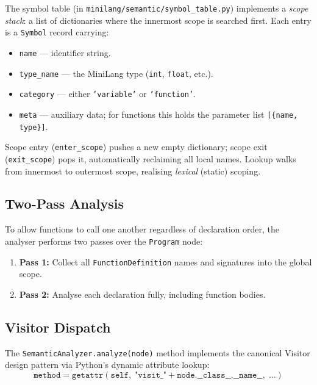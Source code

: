 \documentclass[conference]{IEEEtran}
\begin{document}
The symbol table (in \texttt{minilang/semantic/symbol\_table.py})
implements a \textit{scope stack}: a list of dictionaries where the
innermost scope is searched first. Each entry is a \texttt{Symbol}
record carrying:

\begin{itemize}
  \item \texttt{name} --- identifier string.
  \item \texttt{type\_name} --- the MiniLang type (\texttt{int}, \texttt{float}, etc.).
  \item \texttt{category} --- either \texttt{'variable'} or \texttt{'function'}.
  \item \texttt{meta} --- auxiliary data; for functions this holds the
        parameter list \texttt{[\{name, type\}]}.
\end{itemize}

Scope entry (\texttt{enter\_scope}) pushes a new empty dictionary;
scope exit (\texttt{exit\_scope}) pops it, automatically reclaiming all
local names. Lookup walks from innermost to outermost scope, realising
\textit{lexical} (static) scoping.

\subsection{Two-Pass Analysis}

To allow functions to call one another regardless of declaration order,
the analyser performs two passes over the \texttt{Program} node:

\begin{enumerate}
  \item \textbf{Pass 1:} Collect all \texttt{FunctionDefinition} names
        and signatures into the global scope.
  \item \textbf{Pass 2:} Analyse each declaration fully, including
        function bodies.
\end{enumerate}

\subsection{Visitor Dispatch}

The \texttt{SemanticAnalyzer.analyze(node)} method implements the
canonical Visitor design pattern \cite{gangoffour} via Python's
dynamic attribute lookup:
\begin{equation}
  \texttt{method} = \texttt{getattr}(\texttt{self},\;
  \texttt{"visit\_"} + \texttt{node.\_\_class\_\_.\_\_name\_\_},\;
  \ldots)
\end{equation}
\end{document}

